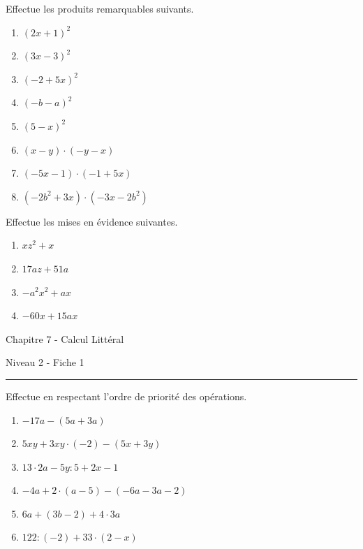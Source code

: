 \documentclass[12pt,parskip=half-, twoside=semi]{scrartcl}
\begin{document}
\begin{exercise}Effectue les produits remarquables suivants.
  \begin{enumerate}[cols=2]
    \item $(2 x+1)^2$
    \item $(3 x-3)^2$
    \item $(-2+5 x)^2$
    \item $(-b-a)^2$
    \item $(5-x)^2$
    \item $(x-y) \cdot(-y-x)$
    \item $(-5 x-1) \cdot(-1+5 x)$
    \item $\left(-2 b^2+3 x\right) \cdot\left(-3 x-2 b^2\right)$
  \end{enumerate}
\end{exercise}

\begin{exercise}Effectue les mises en évidence suivantes.
  \begin{enumerate}[cols=2]
    \item $x z^2+x$
    \item $17 a z+51 a$
    \item $-a^2 x^2+a x$
    \item $-60 x+15 a x$
  \end{enumerate}
\end{exercise}

\begin{center}
  \bfseries
  \begin{Huge}
    Chapitre 7 - Calcul Littéral
  \end{Huge}
  \smallbreak
  \begin{large}
    Niveau 2  - Fiche 1
  \end{large}
  \smallbreak
  \rule[10pt]{.5\linewidth}{1 pt}
\end{center}

\setcounter{exercise}{0}

\begin{exercise}Effectue en respectant l'ordre de priorité des opérations.
  \begin{enumerate}[cols=2]
    \item $-17 a-(5 a+3 a)$
    \item $5 x y+3 x y \cdot (-2)-(5x+3y)$
    \item $13 \cdot 2 a-5 y: 5+2 x-1$
    \item $-4 a+2 \cdot(a-5)-(-6 a-3 a-2)$
    \item $6 a+(3 b-2)+4 \cdot 3 a$
    \item $122:(-2)+33 \cdot(2-x)$
  \end{enumerate}
\end{exercise}
\end{document}
